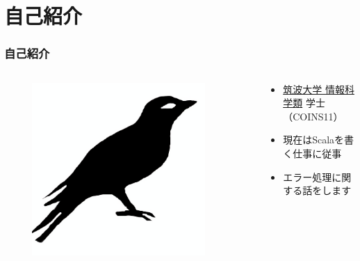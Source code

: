 





\newcommand\ballref[1]{%
\tikz \node[circle, shade,ball color=structure.fg,inner sep=0pt,%
  text width=8pt,font=\tiny,align=center] {\color{white}\ref{#1}};
}




\frame{\maketitle}

\section*{自己紹介}
\begin{frame}[fragile]
  \frametitle{自己紹介}
  
  \begin{columns}
    \begin{column}{0.4\textwidth}
      \centering
      \begin{figure}
        \includegraphics[width=0.9\textwidth]{img/bird2x.png}
      \end{figure}
    \end{column}
    \begin{column}{0.6\textwidth}
      \begin{itemize}
        \item<2-> \href{https://www.coins.tsukuba.ac.jp/}{筑波大学 情報科学類} 学士（COINS11）
        \item<3-> 現在はScalaを書く仕事に従事
        \item<4-> エラー処理に関する話をします
      \end{itemize}
    \end{column}
  \end{columns}
\end{frame}


